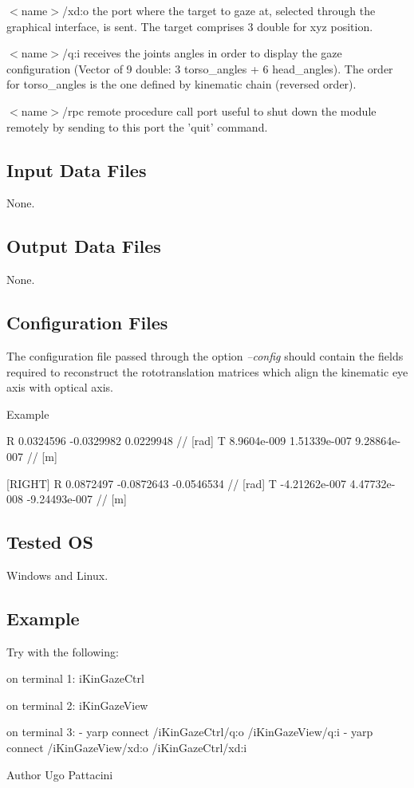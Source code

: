 \begin{DoxyItemize}
\item {\itshape } $<$name$>$/xd\+:o the port where the target to gaze at, selected through the graphical interface, is sent. The target comprises 3 double for xyz position.
\item {\itshape } $<$name$>$/q\+:i receives the joints angles in order to display the gaze configuration (Vector of 9 double\+: 3 torso\+\_\+angles + 6 head\+\_\+angles). The order for torso\+\_\+angles is the one defined by kinematic chain (reversed order).
\item {\itshape } $<$name$>$/rpc remote procedure call port useful to shut down the module remotely by sending to this port the 'quit' command.
\end{DoxyItemize}\hypertarget{group__icub__signalScope_in_files_sec}{}\subsection{Input Data Files}\label{group__icub__signalScope_in_files_sec}
None.\hypertarget{group__icub__signalScope_out_data_sec}{}\subsection{Output Data Files}\label{group__icub__signalScope_out_data_sec}
None.\hypertarget{group__icub__signalScope_conf_file_sec}{}\subsection{Configuration Files}\label{group__icub__signalScope_conf_file_sec}
The configuration file passed through the option {\itshape --config} should contain the fields required to reconstruct the rototranslation matrices which align the kinematic eye axis with optical axis.

Example


\begin{DoxyCode}
[LEFT]
R      0.0324596 -0.0329982 0.0229948               \textcolor{comment}{// [rad]}
T      8.9604e-009 1.51339e-007 9.28864e-007        \textcolor{comment}{// [m]}

[RIGHT]
R      0.0872497 -0.0872643 -0.0546534              \textcolor{comment}{// [rad]}
T      -4.21262e-007 4.47732e-008 -9.24493e-007     \textcolor{comment}{// [m]}
\end{DoxyCode}
\hypertarget{group__icub__tld_tested_os_sec}{}\subsection{Tested O\+S}\label{group__icub__tld_tested_os_sec}
Windows and Linux.\hypertarget{group__icub__signalScope_example_sec}{}\subsection{Example}\label{group__icub__signalScope_example_sec}
Try with the following\+:


\begin{DoxyCode}
on terminal 1: iKinGazeCtrl 
 
on terminal 2: iKinGazeView 
 
on terminal 3: 
- yarp connect /iKinGazeCtrl/q:o  /iKinGazeView/q:i 
- yarp connect /iKinGazeView/xd:o /iKinGazeCtrl/xd:i 
\end{DoxyCode}


\begin{DoxyAuthor}{Author}
Ugo Pattacini 
\end{DoxyAuthor}

